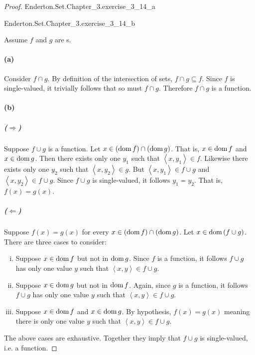 \documentclass{report}
\newcommand{\pair}[1]{\left< #1 \right>}
\begin{document}
\begin{proof}

  \statementpadding

    {Enderton.Set.Chapter\_3.exercise\_3\_14\_a}

    {Enderton.Set.Chapter\_3.exercise\_3\_14\_b}

  Assume $f$ and $g$ are s.

  \paragraph{(a)}%

    Consider $f \cap g$.
    By definition of the intersection of sets, $f \cap g \subseteq f$.
    Since $f$ is single-valued, it trivially follows that so must $f \cap g$.
    Therefore $f \cap g$ is a function.

  \paragraph{(b)}%

    \subparagraph{($\Rightarrow$)}%

      Suppose $f \cup g$ is a function.
      Let $x \in (\mathop{\text{dom}}{f}) \cap (\mathop{\text{dom}}{g})$.
      That is, $x \in \mathop{\text{dom}}{f}$ and $x \in \mathop{\text{dom}}{g}$.
      Then there exists only one $y_1$ such that $\pair{x, y_1} \in f$.
      Likewise there exists only one $y_2$ such that
        $\pair{x, y_2} \in g$.
      But $\pair{x, y_1} \in f \cup g$ and $\pair{x, y_2} \in f \cup g$.
      Since $f \cup g$ is single-valued, it follows $y_1 = y_2$.
      That is, $f(x) = g(x)$.

    \subparagraph{($\Leftarrow$)}%

      Suppose $f(x) = g(x)$ for every $x \in (\mathop{\text{dom}}{f}) \cap (\mathop{\text{dom}}{g})$.
      Let $x \in \mathop{\text{dom}}{(f \cup g)}$.
      There are three cases to consider:

      \begin{enumerate}[(i)]
        \item Suppose $x \in \mathop{\text{dom}}{f}$ but not in $\mathop{\text{dom}}{g}$.
          Since $f$ is a function, it follows $f \cup g$ has only one value $y$
            such that $\pair{x, y} \in f \cup g$.
        \item Suppose $x \in \mathop{\text{dom}}{g}$ but not in $\mathop{\text{dom}}{f}$.
          Again, since $g$ is a function, it follows $f \cup g$ has only one
            value $y$ such that $\pair{x, y} \in f \cup g$.
        \item Suppose $x \in \mathop{\text{dom}}{f}$ and $x \in \mathop{\text{dom}}{g}$.
          By hypothesis, $f(x) = g(x)$ meaning there is only one value $y$ such
            that $\pair{x, y} \in f \cup g$.
      \end{enumerate}

      The above cases are exhaustive.
      Together they imply that $f \cup g$ is single-valued, i.e. a function.

\end{proof}
\end{document}
